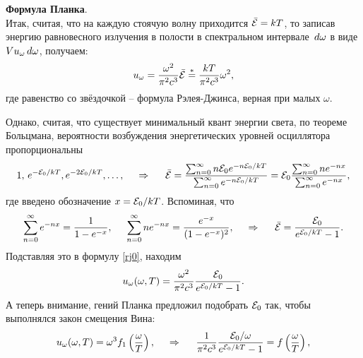 \textbf{Формула Планка}. 
\\
 Итак, считая, что на каждую стоячую волну приходится $\bar{\mathcal E} = kT$, то записав энергию равновесного излучения в полости в спектральном интервале $\, d \omega$ в виде $V u_\omega \, d \omega$, получаем:
 \begin{equation}
     u_\omega  = \frac{\omega^2}{\pi^2 c^3} \bar{\mathcal E} \overset{*}{=}  \frac{kT}{\pi^2 c^3} \omega^2,
     \label{rj0}
 \end{equation}
где равенство со звёздочкой -- формула Рэлея-Джинса, верная при малых $\omega$. 

Однако, считая, что существует минимальный квант энергии света, по теореме Больцмана, вероятности возбуждения энергетических уровней осциллятора пропорциональны
\begin{equation*}
    1,\, e^{-\mathcal E_0/kT}, e^{- 2 \mathcal E_0/kT}, \ldots,
    \hspace{0.5cm} \Rightarrow \hspace{0.5cm}
    \bar{\mathcal E} = \frac{\sum_{n=0}^{\infty}  n \mathcal E_0 e^{- n \mathcal E_0 / kT}}{\sum_{n=0}^{\infty} e^{-n \mathcal E_0 / kT}} = \mathcal E_0 \frac{\sum_{n=0}^{\infty} n e^{-n x}}{\sum_{n=0}^{\infty} e^{-nx}},
\end{equation*}
где введено обозначение $x = \mathcal E_0 / kT$. Вспоминая, что
\begin{equation*}
    \sum_{n=0}^{\infty} e^{-n x} = \frac{1}{1 - e^{-x}},
    \hspace{5 mm} 
    \sum_{n=0}^{\infty} n e^{-nx} = \frac{e^{-x}}{(1-e^{-x})^2},
    \hspace{0.5cm} \Rightarrow \hspace{0.5cm}
    \bar{\mathcal E} = \frac{\mathcal E_0}{e^{\mathcal E_0/ k T} - 1}.
\end{equation*}
Подставляя это в формулу \eqref{rj0}, находим
\begin{equation*}
    u_\omega (\omega, T) = \frac{\omega^2}{\pi^2 c^3} \frac{\mathcal E_0}{e^{\mathcal E_0/ kT}-1}.
\end{equation*}
А теперь внимание, гений Планка предложил подобрать $\mathcal E_0$ так, чтобы выполнялся закон смещения Вина:
\begin{equation*}
     u_\omega (\omega, T) = \omega^3 f_1\left(\frac{\omega}{T}\right),
     \hspace{0.5cm} \Rightarrow \hspace{0.5cm}
     \frac{1}{\pi^2 c^3} \frac{\mathcal E_0 / \omega}{e^{\mathcal E_0 / kT} - 1} = f\left(\frac{\omega}{T}\right),
\end{equation*}
